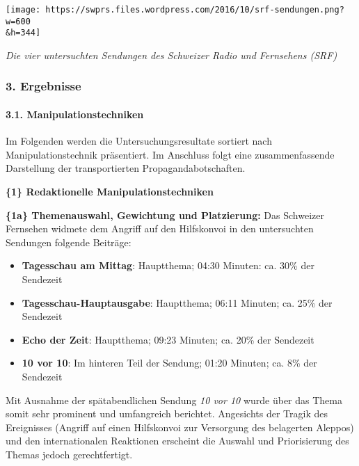 \texttt{[image: https://swprs.files.wordpress.com/2016/10/srf-sendungen.png?w=600\\\&h=344]}

\emph{Die vier untersuchten Sendungen des Schweizer Radio und Fernsehens
(SRF)}

\hypertarget{3-ergebnisse}{%
\subsubsection{3. Ergebnisse}\label{3-ergebnisse}}

\hypertarget{31-manipulationstechniken}{%
\paragraph{3.1.
Manipulationstechniken}\label{31-manipulationstechniken}}

Im Folgenden werden die Untersuchungsresultate sortiert nach
Manipulationstechnik präsentiert. Im Anschluss folgt eine
zusammenfassende Darstellung der transportierten Propaganda­botschaften.

\textbf{\{1\} Redaktionelle Manipulationstechniken}

\textbf{\{1a\} Themenauswahl, Gewichtung und Platzierung:} Das Schweizer
Fernsehen widmete dem Angriff auf den Hilfskonvoi in den untersuchten
Sendungen folgende Beiträge:

\begin{itemize}
\tightlist
\item
  \textbf{Tagesschau am Mittag}: Hauptthema; 04:30 Minuten: ca. 30\% der
  Sendezeit
\item
  \textbf{Tagesschau-Hauptausgabe}: Hauptthema; 06:11 Minuten; ca. 25\%
  der Sendezeit
\item
  \textbf{Echo der Zeit}: Hauptthema; 09:23 Minuten; ca. 20\% der
  Sendezeit
\item
  \textbf{10 vor 10}: Im hinteren Teil der Sendung; 01:20 Minuten; ca.
  8\% der Sendezeit
\end{itemize}

Mit Ausnahme der spätabendlichen Sendung \emph{10 vor 10} wurde über das
Thema somit sehr prominent und umfangreich berichtet. Angesichts der
Tragik des Ereignisses (Angriff auf einen Hilfskonvoi zur Versorgung des
belagerten Aleppos) und den inter­nationalen Reaktionen erscheint die
Auswahl und Priorisierung des Themas jedoch gerechtfertigt.

